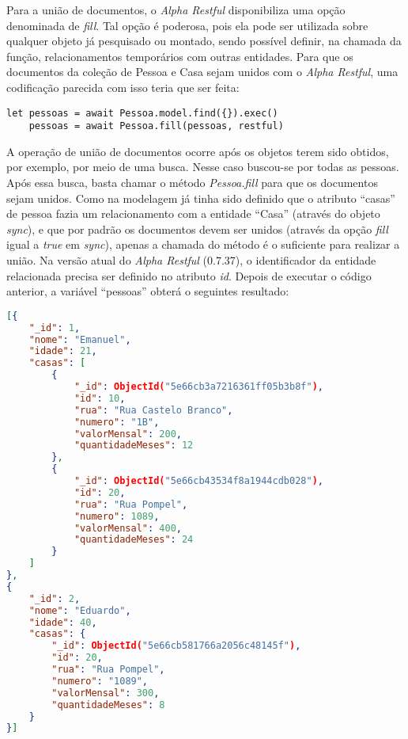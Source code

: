 Para a união de documentos, o \textit{Alpha Restful} disponibiliza uma opção denominada de \textit{fill}. Tal opção é poderosa, pois ela pode ser utilizada sobre qualquer objeto já pesquisado ou montado, sendo possível definir, na chamada da função, relacionamentos temporários com outras entidades. Para que os documentos da coleção de Pessoa e Casa sejam unidos com o \textit{Alpha Restful}, uma codificação parecida com isso teria que ser feita:

\begin{lstlisting}[style=ES6, caption={União de Documentos Com o \textit{Alpha Restful}}]
	let pessoas = await Pessoa.model.find({}).exec()
	pessoas = await Pessoa.fill(pessoas, restful)
\end{lstlisting}

A operação de união de documentos ocorre após os objetos terem sido obtidos, por exemplo, por meio de uma busca. Nesse caso buscou-se por todas as pessoas. Após essa busca, basta chamar o método \textit{Pessoa.fill} para que os documentos sejam unidos. Como na modelagem já tinha sido definido que o atributo ``casas'' de pessoa fazia um relacionamento com a entidade ``Casa'' (através do objeto \textit{sync}), e que por padrão os documentos devem ser unidos (através da opção \textit{fill} igual a \textit{true} em \textit{sync}), apenas a chamada do método é o suficiente para realizar a união. Na versão atual do \textit{Alpha Restful} (0.7.37), o identificador da entidade relacionada precisa ser definido no atributo \textit{id}. Depois de executar o código anterior, a variável ``pessoas'' obterá o seguintes resultado:

\newpage

\begin{lstlisting}[language=json, caption={Junção de Documentos Com o \textit{Alpha Restful}}]
[{
    "_id": 1,
    "nome": "Emanuel",
    "idade": 21,
    "casas": [
        {
            "_id": ObjectId("5e66cb3a7216361ff05b3b8f"),
            "id": 10,
            "rua": "Rua Castelo Branco",
            "numero": "1B",
            "valorMensal": 200,
            "quantidadeMeses": 12
        },
        {
            "_id": ObjectId("5e66cb43534f8a1944cdb028"),
            "id": 20,
            "rua": "Rua Pompel",
            "numero": 1089,
            "valorMensal": 400,
            "quantidadeMeses": 24
        }
    ]
},
{
    "_id": 2,
    "nome": "Eduardo",
    "idade": 40,
    "casas": {
        "_id": ObjectId("5e66cb581766a2056c48145f"),
        "id": 20,
        "rua": "Rua Pompel",
        "numero": "1089",
        "valorMensal": 300,
        "quantidadeMeses": 8
    }
}]
\end{lstlisting}

